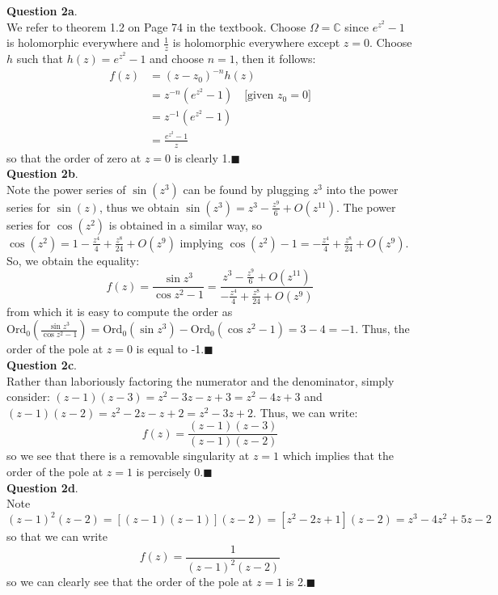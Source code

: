 \documentclass{article}
\begin{document}
    \textbf{Question 2a}.\\
    We refer to theorem 1.2 on Page 74 in the textbook. Choose $\Omega = \mathbb{C}$ since $e^{z^2}-1$ is holomorphic everywhere
    and $\frac{1}{z}$ is holomorphic everywhere except $z=0$. Choose $h$ such that $h(z) = e^{z^2}-1$ and choose $n=1$, then it follows:
    \begin{align*}
        f(z) &= (z - z_0)^{-n}h(z) \\
        &= z^{-n}(e^{z^2}-1)\quad\text{[given $z_0 = 0$]} \\
        &= z^{-1}(e^{z^2}-1) \\
        &= \frac{e^{z^2}-1}{z}
    \end{align*}
    so that the order of zero at $z=0$ is clearly 1.\hfill$\blacksquare$\\

    \textbf{Question 2b}.\\
    Note the power series of $\sin{(z^3)}$ can be found by plugging $z^3$ into the power series for $\sin{(z)}$, thus we obtain
    $\sin{(z^3)} = z^3 - \frac{z^9}{6} + O(z^{11})$. The power series for $\cos{(z^2)}$ is obtained in a similar way, so
    $\cos{(z^2)} = 1 - \frac{z^4}{4} + \frac{z^8}{24} + O(z^9)$ implying $\cos{(z^2)}-1 = -\frac{z^4}{4} + \frac{z^8}{24} + O(z^9)$.
    So, we obtain the equality:
    \[ f(z) = \frac{\sin{z^3}}{\cos{z^2}-1} = \frac{z^3 - \frac{z^9}{6} + O(z^{11})}{-\frac{z^4}{4} + \frac{z^8}{24} + O(z^9)} \]
    from which it is easy to compute the order as $\text{Ord}_0(\frac{\sin{z^3}}{\cos{z^2}-1}) = \text{Ord}_0(\sin{z^3}) - 
    \text{Ord}_0(\cos{z^2}-1) = 3 - 4 = -1$. Thus, the order of the pole at $z=0$ is equal to -1.\hfill$\blacksquare$\\

    \textbf{Question 2c}.\\
    Rather than laboriously factoring the numerator and the denominator, simply consider: $(z-1)(z-3) = z^2 - 3z - z + 3 = z^2 - 4z 
    + 3$ and $(z-1)(z-2) = z^2 - 2z - z + 2 = z^2 - 3z + 2$. Thus, we can write:
    \[ f(z) = \frac{(z-1)(z-3)}{(z-1)(z-2)} \]
    so we see that there is a removable singularity at $z=1$ which implies that the order of the pole at $z=1$ is percisely 
    0.\hfill$\blacksquare$\\

    \textbf{Question 2d}.\\
    Note $(z-1)^2(z-2) = [(z-1)(z-1)](z-2) = [z^2 - 2z + 1](z-2) = z^3 - 4z^2 + 5z - 2$ so that we can write
    \[ f(z) = \frac{1}{(z-1)^2(z-2)} \]
    so we can clearly see that the order of the pole at $z=1$ is 2.\hfill$\blacksquare$\\
\end{document}
